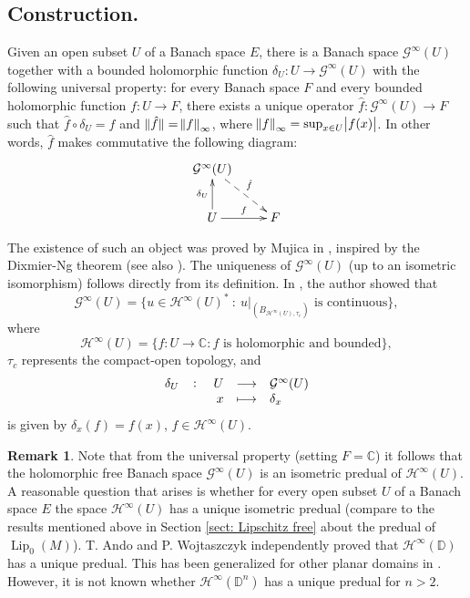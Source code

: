 \documentclass[12pt,leqno]{amsart}
\numberwithin{equation}{section} %
\theoremstyle{definition}
\newtheorem{rem}[thm]{Remark}
\numberwithin{equation}{section}
\newcommand{\C}{\mathbb{C}}
\def\Lip{\operatorname{Lip}}
\begin{document}
\subsection{Construction.} Given an open subset $U$ of a Banach space $E$, there is a Banach space $\mathcal{G}^\infty(U)$ together with a bounded holomorphic function $\delta_U:U\to\mathcal{G}^\infty(U)$ with the following universal property: for every Banach space $F$ and every bounded holomorphic function $f:U\to F$, there exists a unique operator $\hat{f}:\mathcal{G}^\infty(U)\to F$ such that $\hat{f}\circ \delta_U=f$ and $\norm[0]{\hat{f}}=\norm{f}_{\infty}$, where $\norm{f}_{\infty}=\sup_{x\in U}\abs{f(x)}$. In other words, $\hat{f}$ makes commutative the following diagram:
$$
\xymatrix{\mathcal{G}^\infty(U)\ar@{-->}[rd]^{\hat{f}}\\
     U\ar[r]^{f}\ar^{\delta_U}[u]& F }
$$


The existence of such an object was proved by Mujica in \cite[Theorem 2.1]{Mujica91}, inspired by the Dixmier-Ng theorem (see also \cite[p. 417]{Dineen}). The uniqueness of $\mathcal{G}^\infty(U)$ (up to an isometric isomorphism) follows directly from its definition. In  \cite{Mujica91}, the author showed that
$$
\mathcal{G}^\infty(U)=\{u\in\mathcal{H}^\infty(U)^*\::\:\left.u\right|_{(B_{\mathcal{H}^\infty(U),\tau_c})} \text{ is continuous}\},
$$
where
$$\mathcal{H}^\infty(U)=\{f:U\rightarrow \C: f \text{ is holomorphic and bounded}\},$$
$\tau_c$ represents the compact-open topology, and
$$\fullfunction{\delta_U}{U}{\mathcal{G}^\infty(U)}{x}{\delta_x}$$
is given by $\delta_x(f)=f(x)$, $f\in\mathcal{H}^\infty(U)$.



\begin{rem}
Note that from the universal property (setting $F=\C$) it follows that the holomorphic free Banach space $\mathcal{G}^\infty (U)$ is an isometric predual of $\mathcal{H}^\infty(U)$. A reasonable question that arises is whether for every open subset $U$ of a Banach space $E$ the space $\mathcal{H}^\infty(U)$ has a unique isometric predual (compare to the results mentioned above in Section \ref{sect: Lipschitz free} about the predual of $\Lip_0(M)$). T. Ando \cite{Ando} and P. Wojtaszczyk \cite{W} independently proved that $\mathcal{H}^\infty(\mathbb{D})$ has a unique predual. This has been generalized for other planar domains in \cite{RY}. However, it is not known whether $\mathcal{H}^\infty(\mathbb{D}^n)$ has a unique predual for $n>2$.
\end{rem}
\end{document}
